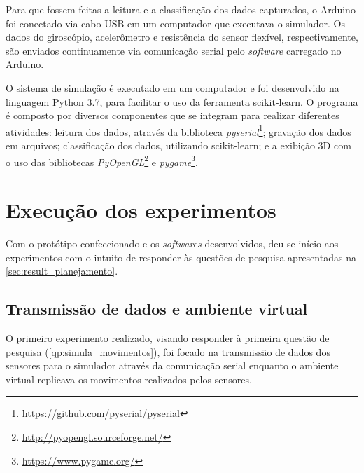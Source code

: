 Para que fossem feitas a leitura e a classificação dos dados capturados, o Arduino foi conectado via cabo USB em um computador que executava o simulador. Os dados do giroscópio, acelerômetro e resistência do sensor flexível, respectivamente, são enviados continuamente via comunicação serial pelo \textit{software} carregado no Arduino.



O sistema de simulação é executado em um computador e foi desenvolvido na linguagem Python 3.7, para facilitar o uso da ferramenta scikit-learn. O programa é composto por diversos componentes que se integram para realizar diferentes atividades: leitura dos dados, através da biblioteca \textit{pyserial}\footnote{\url{https://github.com/pyserial/pyserial}}; gravação dos dados em arquivos; classificação dos dados, utilizando scikit-learn; e a exibição 3D com o uso das bibliotecas \textit{PyOpenGL}\footnote{\url{http://pyopengl.sourceforge.net/}} e \textit{pygame}\footnote{\url{https://www.pygame.org/}}.

%
\section{Execução dos experimentos}\label{sec:result_execucao}
%

Com o protótipo confeccionado e os \textit{softwares} desenvolvidos, deu-se início aos experimentos com o intuito de responder às questões de pesquisa apresentadas na \autoref{sec:result_planejamento}.

\subsection{Transmissão de dados e ambiente virtual}

O primeiro experimento realizado, visando responder à primeira questão de pesquisa (\ref{qp:simula_movimentos}), foi focado na transmissão de dados dos sensores para o simulador através da comunicação serial enquanto o ambiente virtual replicava os movimentos realizados pelos sensores.

